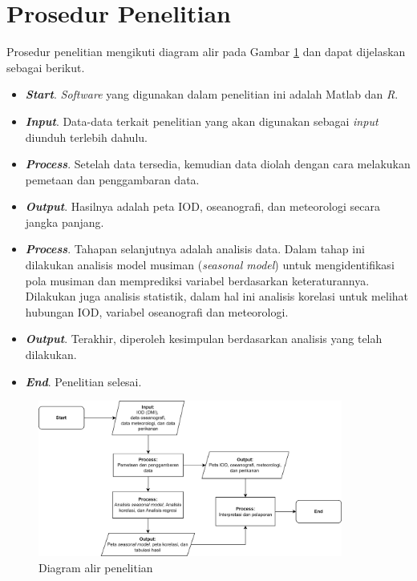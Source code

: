 \section[Prosedur Penelitian]{Prosedur Penelitian}
\begin{spacing}{1.5}
	Prosedur penelitian mengikuti diagram alir pada Gambar \ref{fig:flowchart} dan dapat dijelaskan sebagai berikut. 
	\begin{itemize}
		\item \textbf{\textit{Start}}. \textit{Software} yang digunakan dalam penelitian ini adalah Matlab dan \textit{R}.
		\item \textbf{\textit{Input}}. Data-data terkait penelitian yang akan digunakan sebagai \textit{input} diunduh terlebih dahulu.
		\item \textbf{\textit{Process}}. Setelah data tersedia, kemudian data diolah dengan cara melakukan pemetaan dan penggambaran data.
		\item \textbf{\textit{Output}}. Hasilnya adalah peta IOD, oseanografi, dan meteorologi secara jangka panjang. 
		\item \textbf{\textit{Process}}. Tahapan selanjutnya adalah analisis data. Dalam tahap ini dilakukan analisis model musiman (\textit{seasonal model}) untuk mengidentifikasi pola musiman dan memprediksi variabel berdasarkan keteraturannya. Dilakukan juga analisis statistik, dalam hal ini analisis korelasi untuk melihat hubungan IOD, variabel oseanografi dan meteorologi.
		\item \textbf{\textit{Output}}. Terakhir, diperoleh kesimpulan berdasarkan analisis yang telah dilakukan.
		\item \textbf{\textit{End}}. Penelitian selesai.
	\end{itemize}
	\begin{figure}[H]
		\centering
		\includegraphics[width=10cm]{contents/Figures/Flowchart_Diagram.png}
		\caption{Diagram alir penelitian}
		\label{fig:flowchart}
	\end{figure}
\end{spacing}
